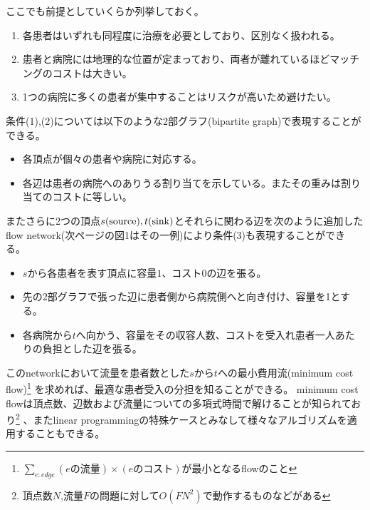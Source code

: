 \documentclass[10pt,uplatex]{jsarticle}
\theoremstyle{case}
\begin{document}
    ここでも前提としていくらか列挙しておく。
    \begin{enumerate}[(1)]
        \item 各患者はいずれも同程度に治療を必要としており、区別なく扱われる。
        \item 患者と病院には地理的な位置が定まっており、両者が離れているほどマッチングのコストは大きい。
        \item 1つの病院に多くの患者が集中することはリスクが高いため避けたい。
    \end{enumerate}

    条件(1),(2)については以下のような2部グラフ(bipartite graph)で表現することができる。
    \begin{itemize}
        \item 各頂点が個々の患者や病院に対応する。
        \item 各辺は患者の病院へのありうる割り当てを示している。またその重みは割り当てのコストに等しい。
    \end{itemize}

    またさらに2つの頂点$s({\rm source}),t({\rm sink})$とそれらに関わる辺を次のように追加したflow network(次ページの図1はその一例)により条件(3)も表現することができる。
    \begin{itemize}
        \item $s$から各患者を表す頂点に容量$1$、コスト$0$の辺を張る。
        \item 先の2部グラフで張った辺に患者側から病院側へと向き付け、容量を1とする。
        \item 各病院から$t$へ向かう、容量をその収容人数、コストを受入れ患者一人あたりの負担とした辺を張る。
    \end{itemize}

    このnetworkにおいて流量を患者数とした$s$から$t$への最小費用流(minimum cost flow)\footnote{$\displaystyle\sum_{e:edge}(eの流量)\times(eのコスト)$が最小となるflowのこと}
    を求めれば、最適な患者受入の分担を知ることができる。
    minimum cost flowは頂点数、辺数および流量についての多項式時間で解けることが知られており\footnote{頂点数$N$,流量$F$の問題に対して$O(FN^2)$で動作するものなどがある}
    、またlinear programmingの特殊ケースとみなして様々なアルゴリズムを適用することもできる。
\end{document}
